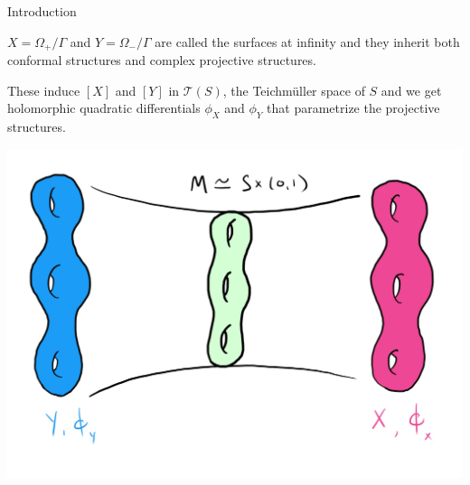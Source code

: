 \documentclass[professionalfont]{beamer}
\begin{document}


\begin{frame}{Introduction}
	
$X = \Omega_+/\Gamma$ and $Y = \Omega_-/\Gamma$ are called the surfaces at infinity and they inherit both conformal structures and complex projective structures. 
\newline

These induce $[X]$ and $[Y]$ in $\mathcal{T}(S)$, the Teichm\"uller space of $S$ and we get holomorphic quadratic differentials $\phi_X$ and $\phi_Y$ that parametrize the projective structures.

\centering\includegraphics[scale=0.1]{QF-sideways.jpg}


\end{frame}
\end{document}
